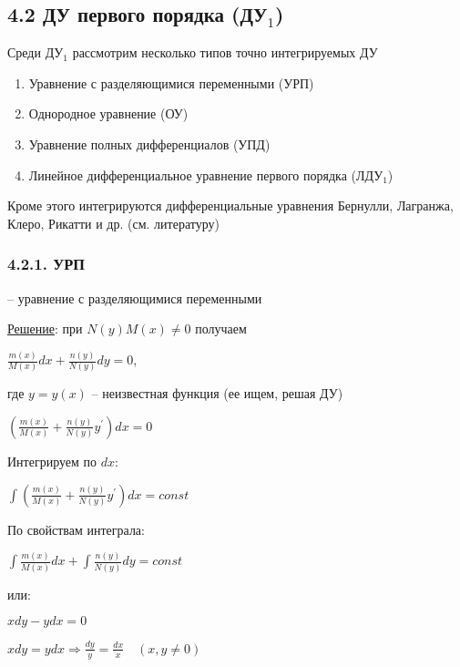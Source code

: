 \documentclass[12pt]{article}
\begin{document}
    \subsection{4.2 ДУ первого порядка (ДУ$_1$)}

    \Nota Среди ДУ$_1$ рассмотрим несколько типов точно интегрируемых ДУ

    \begin{enumerate}
        \item Уравнение с разделяющимися переменными (УРП)

        \item Однородное уравнение (ОУ)

        \item Уравнение полных дифференциалов (УПД)

        \item Линейное дифференциальное уравнение первого порядка (ЛДУ$_1$)
    \end{enumerate}
    Кроме этого интегрируются дифференциальные уравнения Бернулли, Лагранжа, Клеро, Рикатти и др. (см. литературу)

    \hypertarget{equationwithseparablevariables}{}

    \subsubsection{4.2.1. УРП}

    \Def {} -- уравнение с разделяющимися переменными

    \underline{Решение}: при $N(y)M(x) \neq 0$ получаем

    $\frac{m(x)}{M(x)}dx + \frac{n(y)}{N(y)}dy = 0$,
    
    где $y = y(x)$ -- неизвестная функция (ее ищем, решая ДУ)

    $\left(\frac{m(x)}{M(x)} + \frac{n(y)}{N(y)}y^\prime\right)dx = 0$

    Интегрируем по $dx$:

    $\int \left(\frac{m(x)}{M(x)} + \frac{n(y)}{N(y)}y^\prime\right)dx = const$

    По свойствам интеграла:

    $\int \frac{m(x)}{M(x)}dx + \int\frac{n(y)}{N(y)}dy = const$

    или: 

    \Ex $xdy - ydx = 0$

    $xdy = ydx \Longrightarrow \frac{dy}{y} = \frac{dx}{x} \quad (x, y \neq 0)$
\end{document}

